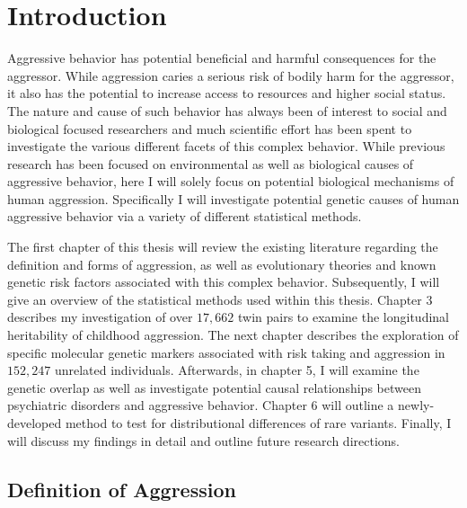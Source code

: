 \chapter{Introduction}
\label{cha:introduction}

Aggressive behavior has potential beneficial and harmful consequences for the aggressor.
While aggression caries a serious risk of bodily harm for the aggressor, it also has the potential to increase access to resources and higher social status.
The nature and cause of such behavior has always been of interest to social and biological focused researchers and much scientific effort has been spent to investigate the various different facets of this complex behavior.
While previous research has been focused on environmental as well as biological causes of aggressive behavior, here I will solely focus on potential biological mechanisms of human aggression.
Specifically I will investigate potential genetic causes of human aggressive behavior via a variety of different statistical methods.

The first chapter of this thesis will review the existing literature regarding the definition and forms of aggression, as well as evolutionary theories and known genetic risk factors associated with this complex behavior.
Subsequently, I will give an overview of the statistical methods used within this thesis.
Chapter 3 describes my investigation of over $17,662$ twin pairs to examine the longitudinal heritability of childhood aggression.
The next chapter describes the exploration of specific molecular genetic markers associated with risk taking and aggression in $152,247$ unrelated individuals.
Afterwards, in chapter 5, I will examine the genetic overlap as well as investigate potential causal relationships between psychiatric disorders and aggressive behavior.
Chapter 6 will outline a newly-developed method to test for distributional differences of rare variants.
Finally, I will discuss my findings in detail and outline future research directions.

\section{Definition of Aggression}
\label{sec:overview_of_reseach_in_aggression}

